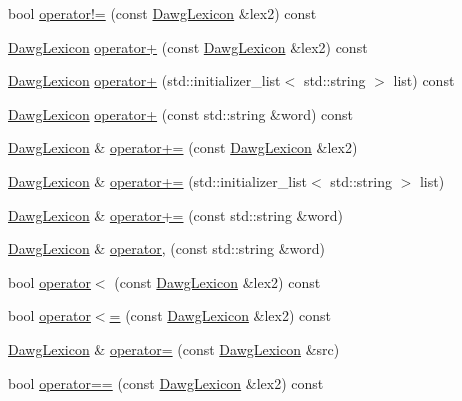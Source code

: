 \begin{DoxyCompactItemize}
\item 
bool \mbox{\hyperlink{classDawgLexicon_a8d198a4165303f1e4877005141c43e31}{operator!=}} (const \mbox{\hyperlink{classDawgLexicon}{Dawg\+Lexicon}} \&lex2) const
\item 
\mbox{\hyperlink{classDawgLexicon}{Dawg\+Lexicon}} \mbox{\hyperlink{classDawgLexicon_ad1dee5fbe47180dbadb3952bb37643ae}{operator+}} (const \mbox{\hyperlink{classDawgLexicon}{Dawg\+Lexicon}} \&lex2) const
\item 
\mbox{\hyperlink{classDawgLexicon}{Dawg\+Lexicon}} \mbox{\hyperlink{classDawgLexicon_a41fac68795179c64eea3dc4c86a30814}{operator+}} (std\+::initializer\+\_\+list$<$ std\+::string $>$ list) const
\item 
\mbox{\hyperlink{classDawgLexicon}{Dawg\+Lexicon}} \mbox{\hyperlink{classDawgLexicon_a218cb40b0674a3db9a362e5b878f7bce}{operator+}} (const std\+::string \&word) const
\item 
\mbox{\hyperlink{classDawgLexicon}{Dawg\+Lexicon}} \& \mbox{\hyperlink{classDawgLexicon_a4f69eb7a84edf9a91861e7083305e501}{operator+=}} (const \mbox{\hyperlink{classDawgLexicon}{Dawg\+Lexicon}} \&lex2)
\item 
\mbox{\hyperlink{classDawgLexicon}{Dawg\+Lexicon}} \& \mbox{\hyperlink{classDawgLexicon_a30565b5b4fdd5efeb9c11fb1943a1d90}{operator+=}} (std\+::initializer\+\_\+list$<$ std\+::string $>$ list)
\item 
\mbox{\hyperlink{classDawgLexicon}{Dawg\+Lexicon}} \& \mbox{\hyperlink{classDawgLexicon_a8d7fe415402649e86e5ccbb3738d358e}{operator+=}} (const std\+::string \&word)
\item 
\mbox{\hyperlink{classDawgLexicon}{Dawg\+Lexicon}} \& \mbox{\hyperlink{classDawgLexicon_ad749b5a8bca43259350ee643e152c2d8}{operator,}} (const std\+::string \&word)
\item 
bool \mbox{\hyperlink{classDawgLexicon_aa7c66db17666a22697ec8076716c3680}{operator$<$}} (const \mbox{\hyperlink{classDawgLexicon}{Dawg\+Lexicon}} \&lex2) const
\item 
bool \mbox{\hyperlink{classDawgLexicon_a054b62f48d59746ad45e92c1b278463e}{operator$<$=}} (const \mbox{\hyperlink{classDawgLexicon}{Dawg\+Lexicon}} \&lex2) const
\item 
\mbox{\hyperlink{classDawgLexicon}{Dawg\+Lexicon}} \& \mbox{\hyperlink{classDawgLexicon_a49b7a2bbf9b046065610b18f6ee07889}{operator=}} (const \mbox{\hyperlink{classDawgLexicon}{Dawg\+Lexicon}} \&src)
\item 
bool \mbox{\hyperlink{classDawgLexicon_a3703f712d34b03fe8ea4f7037ed1cb26}{operator==}} (const \mbox{\hyperlink{classDawgLexicon}{Dawg\+Lexicon}} \&lex2) const

\end{DoxyCompactItemize}
